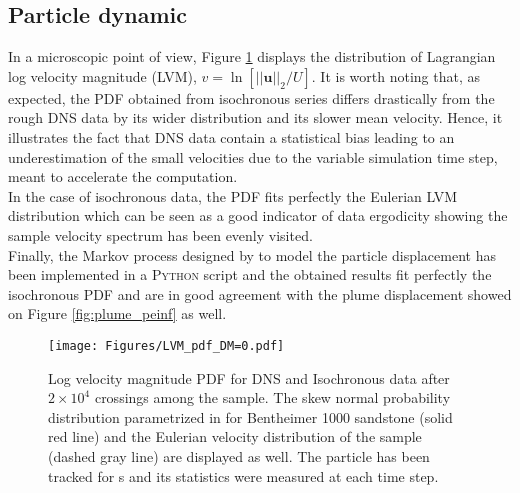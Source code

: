 \subsection{Particle dynamic}
In a microscopic point of view, Figure \ref{fig:lvm_pdf_peinf} displays the distribution of Lagrangian log velocity magnitude (LVM), $v = \ln[||\textbf{u}||_2/U]$. 
It is worth noting that, as expected, the PDF obtained from isochronous series differs drastically from the rough DNS data by its wider distribution and its slower mean velocity.
Hence, it illustrates the fact that DNS data contain a statistical bias leading to an underestimation of the small velocities due to the variable simulation time step, meant to accelerate the computation.\\
In the case of isochronous data, the PDF fits perfectly the Eulerian LVM distribution which can be seen as a good indicator of data ergodicity showing the sample velocity spectrum has been evenly visited.\\
Finally, the Markov process designed by \cite{Meyer2016} to model the particle displacement has been implemented in a \textsc{Python} script and the obtained results fit perfectly the isochronous PDF and are in good agreement with the plume displacement showed on Figure \ref{fig:plume_peinf} as well.

\begin{figure}
	\centering
	\texttt{[image: Figures/LVM\_pdf\_DM=0.pdf]}
	\caption{Log velocity magnitude PDF for DNS and Isochronous data after $2\times 10^4$ crossings among the sample. The skew normal probability distribution parametrized in \citet{Meyer2016} for Bentheimer 1000 sandstone (solid red line) and the Eulerian velocity distribution of the sample (dashed gray line) are displayed as well. The particle has been tracked for s and its statistics were measured at each time step.}
	\label{fig:lvm_pdf_peinf}
\end{figure}

